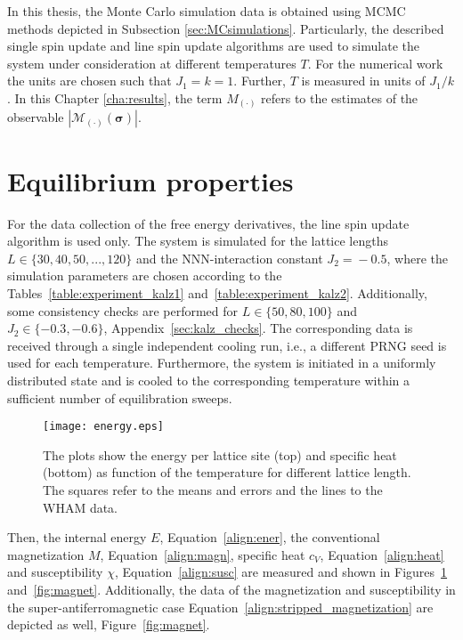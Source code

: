 \label{cha:results}


In this thesis, the Monte Carlo simulation data is obtained using MCMC methods depicted in Subsection \ref{sec:MCsimulations}. Particularly, 
the described single spin update and line spin update algorithms are used to simulate the system under consideration at different temperatures $T$. For the 
numerical work the units are chosen such that $J_1\!=\!k\!=\!1$. Further, $T$ is measured in units of $J_1/k$. In this Chapter \ref{cha:results}, the term $M_{(\cdot)}$ refers to the estimates of the observable $|\mathcal{M}_{(\cdot)}(\bm{\sigma})|$.





\section{Equilibrium properties}
\label{sec:kalz_experiment}

For the data collection of the free energy derivatives, the line spin update algorithm is used only. The system is simulated for the 
lattice lengths $L\!\in\!\{30,40,50,...,120\}$ and the NNN-interaction constant $J_2\!=\!-0.5$, where the simulation parameters are chosen according to the
Tables~\ref{table:experiment_kalz1} and~\ref{table:experiment_kalz2}. Additionally, some consistency checks are performed for $L\!\in\!\{50,80,100\}$ and 
$J_2\!\in\!\{-0.3,-0.6\}$, Appendix~\ref{sec:kalz_checks}. The corresponding data is received through a single independent cooling run, i.e., 
a different PRNG seed is used for each temperature. Furthermore, the system is initiated in a uniformly distributed state
and is cooled to the corresponding temperature within a sufficient number of equilibration sweeps.

\begin{figure}[!h]
  \texttt{[image: energy.eps]}
  \caption{The plots show the energy per lattice site (top) and specific heat (bottom) as function of the temperature for different lattice length.
           The squares refer to the means and errors and the lines to the WHAM data.}
  \label{fig:energy}
\end{figure}

Then, the internal energy $E$, Equation~\eqref{align:ener}, the conventional magnetization $M$, Equation~\eqref{align:magn}, specific heat $c_V$,
Equation~\eqref{align:heat} and susceptibility $\chi$, Equation~\eqref{align:susc} are measured and shown in Figures~\ref{fig:energy} and~\ref{fig:magnet}. 
Additionally, the data of the magnetization and susceptibility in the super-antiferromagnetic case Equation~\eqref{align:stripped_magnetization}
are depicted as well, 
Figure~\ref{fig:magnet}. 

